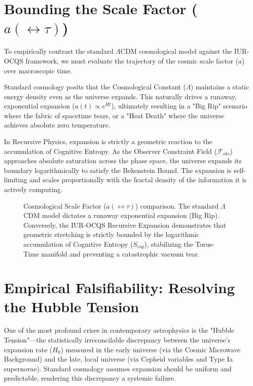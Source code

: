 \documentclass[12pt,openany]{book}
\begin{document}
\section{Bounding the Scale Factor ($a(\leftrightarrow\tau)$)}
To empirically contrast the standard $\Lambda$CDM cosmological model against the IUR-OCQS framework, we must evaluate the trajectory of the cosmic scale factor ($a$) over macroscopic time.

Standard cosmology posits that the Cosmological Constant ($\Lambda$) maintains a static energy density even as the universe expands. This naturally drives a runaway, exponential expansion ($a(t) \propto e^{Ht}$), ultimately resulting in a "Big Rip" scenario where the fabric of spacetime tears, or a "Heat Death" where the universe achieves absolute zero temperature.

In Recursive Physics, expansion is strictly a geometric reaction to the accumulation of Cognitive Entropy. As the Observer Constraint Field ($\mathcal{F}_{obs}$) approaches absolute saturation across the phase space, the universe expands its boundary logarithmically to satisfy the Bekenstein Bound. The expansion is self-limiting and scales proportionally with the fractal density of the information it is actively computing.

\begin{figure}[h]
    \centering
    \caption{Cosmological Scale Factor ($a(\leftrightarrow\tau)$) comparison. The standard $\Lambda$CDM model dictates a runaway exponential expansion (Big Rip). Conversely, the IUR-OCQS Recursive Expansion demonstrates that geometric stretching is strictly bounded by the logarithmic accumulation of Cognitive Entropy ($S_{cog}$), stabilizing the Torus-Time manifold and preventing a catastrophic vacuum tear.}
    \label{fig:scale_factor}
\end{figure}

\section{Empirical Falsifiability: Resolving the Hubble Tension}
One of the most profound crises in contemporary astrophysics is the "Hubble Tension"---the statistically irreconcilable discrepancy between the universe's expansion rate ($H_0$) measured in the early universe (via the Cosmic Microwave Background) and the late, local universe (via Cepheid variables and Type Ia supernovae). Standard cosmology assumes expansion should be uniform and predictable, rendering this discrepancy a systemic failure.
\end{document}
